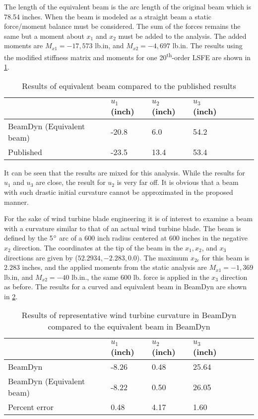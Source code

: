 \documentclass[letterpaper,12pt]{article}
\begin{document}
The length of the equivalent beam is the arc length of the original beam which is 78.54 inches. When the beam is modeled as a straight beam a static force/moment balance must be considered. The sum of the forces remains the same but a moment about $x_1$ and $x_2$ must be added to the analysis. The added moments are $M_{x1} = -17,573$ lb.in, and $M_{x2} = -4,697$ lb.in. The results using the modified stiffness matrix and moments for one 20\textsuperscript{th}-order LSFE are shown in \ref{tab:curve3}. 
\begin{table}
\caption{\label{tab:curve3} Results of equivalent beam compared to the published results}
\begin{center}
    \begin{tabular}{| l | l | l | l | l | l | l |}
    	\hline
    	        & $u_1$ (inch) & $u_2$ (inch) & $u_3$ (inch)  \\ \hline
    	BeamDyn (Equivalent beam) & -20.8     & 6.0       & 54.2      \\  \hline
    	Published   & -23.5     & 13.4       & 53.4     \\ \hline
    \end{tabular}
\end{center}
\end{table} 

It can be seen that the results are mixed for this analysis. While the results for $u_1$ and $u_3$ are close, the result for $u_2$ is very far off. It is obvious that a beam with such drastic initial curvature cannot be approximated in the proposed manner. 

For the sake of wind turbine blade engineering it is of interest to examine a beam with a curvature similar to that of an actual wind turbine blade. The beam is defined by the 5$\degree$ arc of a 600 inch radius centered at 600 inches in the negative $x_2$ direction. The coordinates at the tip of the beam in the $x_1, x_2$, and $x_3$ directions are given by ($52.2934, -2.283, 0.0$). The maximum $x_{2c}$ for this beam is $2.283$ inches, and the applied moments from the static analysis are $M_{x1} = -1,369$ lb.in, and $M_{x2} = -40$ lb.in., the same 600 lb. force is applied in the $x_3$ direction as before. The results for a curved and equivalent beam in BeamDyn are shown in \ref{tab:curve4}.
 
\begin{table}
\caption{\label{tab:curve4} Results of representative wind turbine curvature in BeamDyn compared to the equivalent beam in BeamDyn}
\begin{center}
    \begin{tabular}{| l | l | l | l | l | l | l |}
    	\hline
    	        & $u_1$ (inch) & $u_2$ (inch) & $u_3$ (inch)  \\ \hline
    	BeamDyn  & -8.26     & 0.48       & 25.64      \\  \hline
    	BeamDyn (Equivalent beam)  & -8.22     & 0.50       & 26.05     \\ \hline
    	Percent error  & 0.48     & 4.17       & 1.60     \\ \hline
    \end{tabular}
\end{center}
\end{table} 
\end{document}
